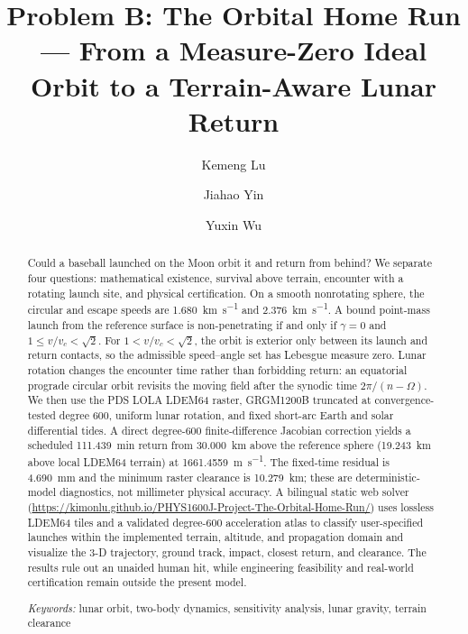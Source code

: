



\title{Problem B: The Orbital Home Run --- From a Measure-Zero Ideal Orbit to a Terrain-Aware Lunar Return}

\author{Kemeng Lu}
\author{Jiahao Yin}
\author{Yuxin Wu}

\begin{abstract}
Could a baseball launched on the Moon orbit it and return from behind? We separate four questions: mathematical existence, survival above terrain, encounter with a rotating launch site, and physical certification. On a smooth nonrotating sphere, the circular and escape speeds are \SI{1.680}{\kilo\metre\per\second} and \SI{2.376}{\kilo\metre\per\second}. A bound point-mass launch from the reference surface is non-penetrating if and only if \(\gamma=0\) and \(1\leq v/v_c<\sqrt2\). For \(1<v/v_c<\sqrt2\), the orbit is exterior only between its launch and return contacts, so the admissible speed--angle set has Lebesgue measure zero. Lunar rotation changes the encounter time rather than forbidding return: an equatorial prograde circular orbit revisits the moving field after the synodic time \(2\pi/(n-\Omega)\). We then use the PDS LOLA LDEM64 raster, GRGM1200B truncated at convergence-tested degree 600, uniform lunar rotation, and fixed short-arc Earth and solar differential tides. A direct degree-600 finite-difference Jacobian correction yields a scheduled \SI{111.439}{min} return from \SI{30.000}{km} above the reference sphere (\SI{19.243}{km} above local LDEM64 terrain) at \SI{1661.4559}{\metre\per\second}. The fixed-time residual is \SI{4.690}{mm} and the minimum raster clearance is \SI{10.279}{km}; these are deterministic-model diagnostics, not millimeter physical accuracy. A bilingual static web solver (\url{https://kimonlu.github.io/PHYS1600J-Project-The-Orbital-Home-Run/}) uses lossless LDEM64 tiles and a validated degree-600 acceleration atlas to classify user-specified launches within the implemented terrain, altitude, and propagation domain and visualize the 3-D trajectory, ground track, impact, closest return, and clearance. The results rule out an unaided human hit, while engineering feasibility and real-world certification remain outside the present model.

\textit{Keywords:} lunar orbit, two-body dynamics, sensitivity analysis, lunar gravity, terrain clearance
\end{abstract}

